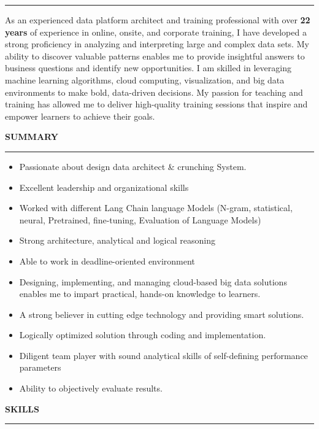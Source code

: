 \documentclass[a4paper]{article}
\begin{document}
\rule{\textwidth}{0.4pt}


As an experienced data platform architect and training professional with
over \textbf{22 years} of experience in online, onsite, and corporate
training, I have developed a strong proficiency in analyzing and
interpreting large and complex data sets. My ability to discover
valuable patterns enables me to provide insightful answers to business
questions and identify new opportunities. I am skilled in leveraging
machine learning algorithms, cloud computing, visualization, and big
data environments to make bold, data-driven decisions. My passion for
teaching and training has allowed me to deliver high-quality training
sessions that inspire and empower learners to achieve their goals.


\begin{center}
  \textbf{SUMMARY}
  \rule{\textwidth}{0.4pt}  %
\end{center}


\begin{itemize}
\item
  Passionate about design data architect \& crunching System.
\item
  Excellent leadership and organizational skills
\item
  Worked with different Lang Chain language Models (N-gram, statistical,
  neural, Pretrained, fine-tuning, Evaluation of Language Models)
\item
  Strong architecture, analytical and logical reasoning
\item
  Able to work in deadline-oriented environment
\item
  Designing, implementing, and managing cloud-based big data solutions
  enables me to impart practical, hands-on knowledge to learners.
\item
  A strong believer in cutting edge technology and providing smart
  solutions.
\item
  Logically optimized solution through coding and implementation.
\item
  Diligent team player with sound analytical skills of self-defining
  performance parameters
\item
  Ability to objectively evaluate results.
\end{itemize}

\begin{center}
  \textbf{SKILLS}
  \rule{\textwidth}{0.4pt}  %
\end{center}
\end{document}
